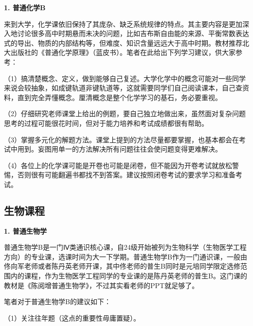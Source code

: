 \textbf{1. 普通化学B}

来到大学，化学课依旧保持了其庞杂、缺乏系统规律的特点。其主要内容是更加深入地讨论很多高中时期悬而未决的问题，比如吉布斯自由能的来源、平衡常数表达式的导出、物质的内部结构等，但难度、知识含量远远大于高中时期。教材推荐北大出版社的《普通化学原理》（蓝皮书）。笔者在此给出下列学习建议，供大家参考：

\vspace{10pt}

（1）搞清楚概念、定义，做到能够自己复述。大学化学中的概念可能对一些同学来说会较抽象，如成键轨道非键轨道等，这就需要同学们自己阅读课本，自己查资料，直到完全弄懂概念。厘清概念是整个化学学习的基石，务必要重视。

\vspace{10pt}

（2）仔细研究老师课堂上给出的例题，要自己独立地做出来，虽然面对复杂问题思考的过程可能很花时间，但对于能力培养和考试成绩都很有帮助。

\vspace{10pt}

（3）掌握多元化的解题方法。课堂上提到的方法尽量都要掌握，也基本都会在考试中用到。妄图用单一的方法解决所有问题往往会使问题变得更难解决。

\vspace{10pt}

（4）各位上的化学课可能是开卷也可能是闭卷，但不能因为开卷考试就放松警惕，否则很有可能翻遍书都找不到答案。建议按照闭卷考试的要求学习和准备考试。

\subsection{生物课程}

\textbf{1. 普通生物学}

普通生物学B是一门Ⅳ类通识核心课，自24级开始被列为生物科学（生物医学工程方向）的专业课，选课时间为大一下学期。普通生物学B作为一门通识课，一般由佟向军老师或者陈丹英老师开课，其中佟老师的普生B同时是元培同学限定选修范围内的课程，作为生物医学工程同学的专业课的是陈丹英老师的普生B。这门课的教材是《陈阅增普通生物学》，不过其实看老师的PPT就足够了。

\vspace{10pt}

笔者对于普通生物学B的建议如下：

\vspace{10pt}

（1）关注往年题（这点的重要性毋庸置疑）。

\vspace{10pt}

